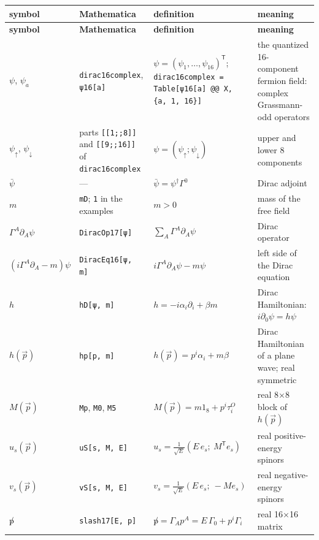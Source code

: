 \documentclass[10pt,a4paper]{article}
\begin{document}
{\small
\begin{longtable}{>{\raggedright\arraybackslash}p{}>{\raggedright\arraybackslash}p{}>{\raggedright\arraybackslash}p{}>{\raggedright\arraybackslash}p{}}
\toprule
\textbf{symbol} & \textbf{Mathematica} & \textbf{definition} & \textbf{meaning} \\
\midrule\endfirsthead
\toprule
\textbf{symbol} & \textbf{Mathematica} & \textbf{definition} & \textbf{meaning} \\
\midrule\endhead
\endfoot
\bottomrule\endlastfoot
$\psi$, $\psi_a$ & \texttt{dirac16complex}, \texttt{ψ16[a]} & $\psi=(\psi_1,\dots,\psi_{16})^{\mathsf T}$; \texttt{dirac16complex = Table[ψ16[a] @@ X, \{a, 1, 16\}]} & the quantized 16-component fermion field: complex Grassmann-odd operators \\
$\psi_\uparrow$, $\psi_\downarrow$ & parts \texttt{[[1;;8]]} and \texttt{[[9;;16]]} of \texttt{dirac16complex} & $\psi=(\psi_\uparrow;\psi_\downarrow)$ & upper and lower 8 components \\
$\bar\psi$ & — & $\bar\psi=\psi^\dagger\Gamma^0$ & Dirac adjoint \\
$m$ & \texttt{mD}; \texttt{1} in the examples & $m>0$ & mass of the free field \\
$\Gamma^A\partial_A\psi$ & \texttt{DiracOp17[ψ]} & $\sum_A\Gamma^A\partial_A\psi$ & Dirac operator \\
$(i\Gamma^A\partial_A-m)\psi$ & \texttt{DiracEq16[ψ, m]} & $i\Gamma^A\partial_A\psi-m\psi$ & left side of the Dirac equation \\
$h$ & \texttt{hD[ψ, m]} & $h=-i\alpha_i\partial_i+\beta m$ & Dirac Hamiltonian: $i\partial_0\psi=h\psi$ \\
$h(\vec p)$ & \texttt{hp[p, m]} & $h(\vec p)=p^i\alpha_i+m\beta$ & Dirac Hamiltonian of a plane wave; real symmetric \\
$M(\vec p)$ & \texttt{Mp}, \texttt{M0}, \texttt{M5} & $M(\vec p)=m1_8+p^i\tau^{O}_i$ & real 8×8 block of $h(\vec p)$ \\
$u_s(\vec p)$ & \texttt{uS[s, M, E]} & $u_s=\frac1{\sqrt E}(E\,e_s;\ M^{\mathsf T}e_s)$ & real positive-energy spinors \\
$v_s(\vec p)$ & \texttt{vS[s, M, E]} & $v_s=\frac1{\sqrt E}(E\,e_s;\ -M e_s)$ & real negative-energy spinors \\
$\not p$ & \texttt{slash17[E, p]} & $\not p=\Gamma_Ap^A=E\,\Gamma_0+p^i\Gamma_i$ & real 16×16 matrix \\

\end{longtable}}
\end{document}
